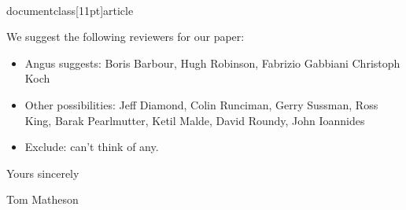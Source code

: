 \\documentclass[11pt]{article}
\begin{document}
We suggest the following reviewers for our paper:

\begin{itemize}

\item Angus suggests: Boris Barbour, Hugh Robinson, Fabrizio Gabbiani
  Christoph Koch

\item Other possibilities: Jeff Diamond, Colin Runciman, Gerry
  Sussman, Ross King, Barak Pearlmutter, Ketil Malde, David Roundy,
  John Ioannides

\item Exclude: can't think of any. 

\end{itemize}

\noindent Yours sincerely

\noindent Tom Matheson
\end{document}

